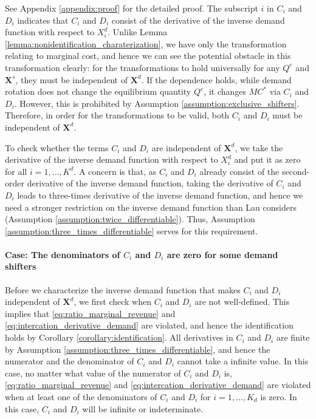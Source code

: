 \documentclass[11pt, a4paper]{article}
\begin{document}
See Appendix \ref{appendix:proof} for the detailed proof.
The subscript $i$ in $C_i$ and $D_i$ indicates that $C_i$ and $D_i$ consist of the derivative of the inverse demand function with respect to $X^{d}_i$.
Unlike Lemma \ref{lemma:nonidentification_charaterization}, we have only the transformation relating to marginal cost, and hence we can see the potential obstacle in this transformation clearly: for the transformations to hold universally for any $Q^e$ and $\bm{X}^{s}$, they must be independent of $\bm{X}^{d}$.
If the dependence holds, while demand rotation does not change the equilibrium quantity $Q^e$, it changes $MC^{*}$ via $C_i$ and $D_i$.
However, this is prohibited by Assumption \ref{assumption:exclusive_shifters}. 
Therefore, in order for the transformations to be valid, both $C_i$ and $D_i$ must be independent of $\bm{X}^{d}$.

To check whether the terms $C_i$ and $D_i$ are independent of $\bm{X}^{d}$, we take the derivative of the inverse demand function with respect to $X^{d}_i$ and put it as zero for all $i = 1,\ldots, K^{d}$.
A concern is that, as $C_i$ and $D_i$ already consist of the second-order derivative of the inverse demand function, taking the derivative of $C_i$ and $D_i$ leads to three-times derivative of the inverse demand function, and hence we need a stronger restriction on the inverse demand function than Lau considers (Assumption \ref{assumption:twice_differentiable}).
Thus, Assumption \ref{assumption:three_times_differentiable} serves for this requirement.


\paragraph{Case: The denominators of $C_i$ and $D_i$ are zero for some demand shifters}
Before we characterize the inverse demand function that makes $C_i$ and $D_i$ independent of $\bm{X}^{d}$, we first check when $C_i$ and $D_i$ are not well-defined.
This implies that \eqref{eq:ratio_marginal_revenue} and \eqref{eq:intercation_derivative_demand} are violated, and hence the identification holds by Corollary \ref{corollary:identification}.
All derivatives in $C_i$ and $D_i$ are finite by Assumption \ref{assumption:three_times_differentiable}, and hence the numerator and the denominator of $C_i$ and $D_i$ cannot take a infinite value.
In this case, no matter what value of the numerator of $C_i$ and $D_i$ is, \eqref{eq:ratio_marginal_revenue} and \eqref{eq:intercation_derivative_demand} are violated when at least one of the denominators of $C_i$ and $D_i$ for $i= 1, \ldots, K_d$ is zero.
In this case, $C_i$ and $D_i$ will be infinite or indeterminate.
\end{document}

